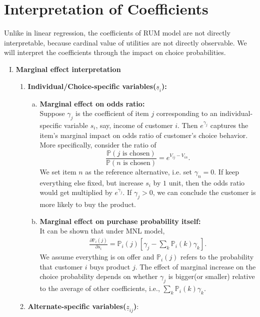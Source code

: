 \documentclass[11pt]{article}
\newcommand{\prob}{\ensuremath{\mathbb{P}}}
\begin{document}
\section{Interpretation of Coefficients}
Unlike in linear regression, the coefficients of RUM model are not directly interpretable, because cardinal value of utilities are not directly observable. We will interpret the coefficients through the impact on choice probabilities.
\begin{enumerate}[I.]
\item \textbf{Marginal effect interpretation}
\begin{enumerate}[1.]
\item \textbf{Individual/Choice-specific variables($\underline{s}_i$):}
\begin{enumerate}[(a)]
\item \textbf{Marginal effect on odds ratio:}
\vspace{0.3em}\\
\text{\quad}Suppose $\gamma_j$ is the coefficient of item $j$ corresponding to an individual-specific variable $s_i$, say, income of customer $i$. Then $e^{\gamma_j}$ captures the item's marginal impact on odds ratio of customer's choice behavior. More specifically, consider the ratio of 
\begin{equation*}
\frac{\prob(j \text{ is chosen})}{\prob(n \text{ is chosen})} = e^{V_{ij}-V_{in}}. 
\end{equation*}
We set item $n$ as the reference alternative, i.e. set $\gamma_n = 0$. If keep everything else fixed, but increase $s_i$ by $1$ unit, then the odds ratio would get multiplied by $e^{\gamma_j}$. If $\gamma_j > 0$, we can conclude the customer is more likely to buy the product.
\item \textbf{Marginal effect on purchase probability itself:}
\vspace{0.3em}\\
\text{\quad}It can be shown that under MNL model,
\begin{align*}
\frac{\partial \prob_i(j)}{\partial s_i} = \prob_i(j)\left[\gamma_j - \sum_k \prob_i(k) \gamma_k\right].
\end{align*}
We assume everything is on offer and $\prob_i(j)$ refers to the probability that customer $i$ buys product $j$. The effect of marginal increase on the choice probability depends on whether $\gamma_j$ is bigger(or smaller) relative to the average of other coefficients, i.e., $\sum_k \prob_i(k) \gamma_k$.
\end{enumerate}
\item \textbf{Alternate-specific variables($\underline{z}_{ij}$)}:

\end{enumerate}
\end{enumerate}
\end{document}
